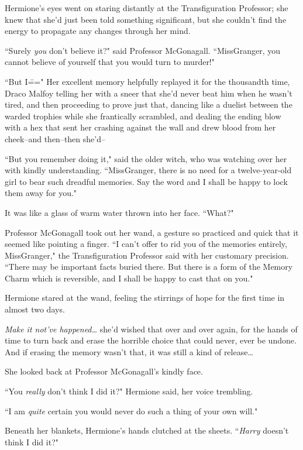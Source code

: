 Hermione's eyes went on staring distantly at the Transfiguration Professor; she knew that she'd just been told something significant, but she couldn't find the energy to propagate any changes through her mind.

``Surely \emph{you} don't believe it?" said Professor McGonagall. ``Miss\?Granger, you cannot believe of yourself that you would turn to murder!"

``But I\===" Her excellent memory helpfully replayed it for the thousandth time, Draco Malfoy telling her with a sneer that she'd never beat him when he wasn't tired, and then proceeding to prove just that, dancing like a duelist between the warded trophies while she frantically scrambled, and dealing the ending blow with a hex that sent her crashing against the wall and drew blood from her cheek\---and then\---then she'd\---

``But you remember doing it," said the older witch, who was watching over her with kindly understanding. ``Miss\?Granger, there is no need for a twelve-year-old girl to bear such dreadful memories. Say the word and I shall be happy to lock them away for you."

It was like a glass of warm water thrown into her face. ``What?"

Professor McGonagall took out her wand, a gesture so practiced and quick that it seemed like pointing a finger. ``I can't offer to rid you of the memories entirely, Miss\?Granger," the Transfiguration Professor said with her customary precision. ``There may be important facts buried there. But there is a form of the Memory Charm which is reversible, and I shall be happy to cast that on you."

Hermione stared at the wand, feeling the stirrings of hope for the first time in almost two days.

\emph{Make it not've happened{\ldots}} she'd wished that over and over again, for the hands of time to turn back and erase the horrible choice that could never, ever be undone. And if erasing the memory wasn't that, it was still a kind of release{\ldots}

She looked back at Professor McGonagall's kindly face.

``You \emph{really} don't think I did it?" Hermione said, her voice trembling.

``I am \emph{quite} certain you would never do such a thing of your own will."

Beneath her blankets, Hermione's hands clutched at the sheets. ``\emph{Harry} doesn't think I did it?"

